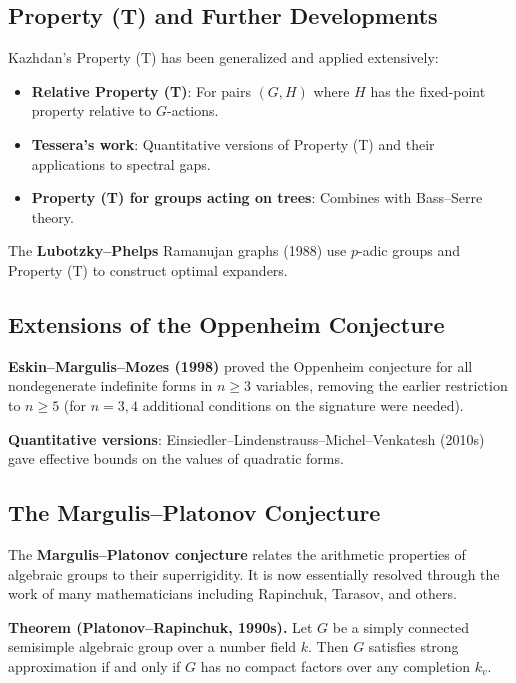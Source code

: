 \subsection{Property (T) and Further Developments}

Kazhdan's Property (T) has been generalized and applied extensively:

\begin{itemize}
\item \textbf{Relative Property (T)}: For pairs $(G, H)$ where $H$
has the fixed-point property relative to $G$-actions.
\item \textbf{Tessera's work}: Quantitative versions of Property (T)
and their applications to spectral gaps.
\item \textbf{Property (T) for groups acting on trees}:
Combines with Bass--Serre theory.
\end{itemize}

The \textbf{Lubotzky--Phelps} Ramanujan graphs (1988) use $p$-adic
groups and Property (T) to construct optimal expanders.

\subsection{Extensions of the Oppenheim Conjecture}

\textbf{Eskin--Margulis--Mozes (1998)} proved the Oppenheim
conjecture for all nondegenerate indefinite forms in $n \geq 3$
variables, removing the earlier restriction to $n \geq 5$ (for $n =
3, 4$ additional conditions on the signature were needed).

\textbf{Quantitative versions}: Einsiedler--Lindenstrauss--Michel--Venkatesh
(2010s) gave effective bounds on the values of quadratic forms.

\subsection{The Margulis--Platonov Conjecture}

The \textbf{Margulis--Platonov conjecture} relates the arithmetic
properties of algebraic groups to their superrigidity. It is now
essentially resolved through the work of many mathematicians
including Rapinchuk, Tarasov, and others.

\textbf{Theorem (Platonov--Rapinchuk, 1990s).} Let $G$ be a
simply connected semisimple algebraic group over a number field $k$.
Then $G$ satisfies strong approximation if and only if $G$ has no
compact factors over any completion $k_v$.

